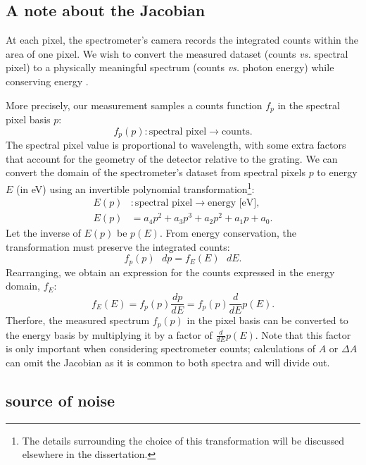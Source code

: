 \subsection{A note about the Jacobian}

At each pixel, the spectrometer's camera records the integrated counts within the area of one pixel. We wish to convert the measured dataset (counts \textit{vs.} spectral pixel) to a physically meaningful spectrum (counts \textit{vs.} photon energy) while conserving energy \cite{mooneyGetBasicsRight2013}.

More precisely, our measurement samples a counts function $f_p$ in the spectral pixel basis $p$:
\begin{equation}
f_p (p): \text{spectral pixel} \rightarrow \text{counts}.
\end{equation}
The spectral pixel value is proportional to wavelength, with some extra factors that account for the geometry of the detector relative to the grating. We can convert the domain of the spectrometer's dataset from spectral pixels $p$ to energy $E$ (in eV) using an invertible polynomial transformation\footnote{The details surrounding the choice of this transformation will be discussed elsewhere in the dissertation.}:
\begin{equation}
\begin{aligned}
E(p)&: \text{spectral pixel} \rightarrow \text{energy [eV]}, \\
E(p) &= a_4 p^2 + a_3 p^3 + a_2 p^2 + a_1 p + a_0.
\end{aligned}
\end{equation}
Let the inverse of $E(p)$ be $p(E)$. From energy conservation, the transformation must preserve the integrated counts:
\begin{equation}
f_p(p) \text{ } dp = f_E(E) \text{ } dE.
\end{equation}
Rearranging, we obtain an expression for the counts expressed in the energy domain, $f_E$:
\begin{equation}
f_E (E) = f_p (p) \frac{dp}{dE} = f_p(p) \frac{d}{dE} p(E).
\label{eqn:spectrometer_jacobian}
\end{equation}
Therfore, the measured spectrum $f_p(p)$ in the pixel basis can be converted to the energy basis by multiplying it by a factor of $\frac{d}{dE} p(E)$. Note that this factor is only important when considering spectrometer counts; calculations of $A$ or $\Delta A$ can omit the Jacobian as it is common to both spectra and will divide out.

\subsection{source of noise}
